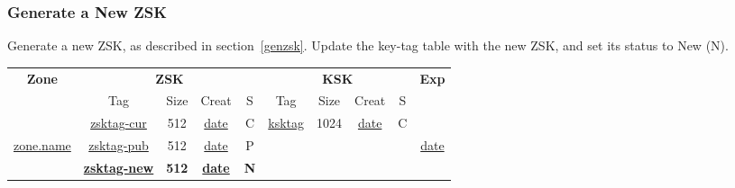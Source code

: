 
\subsubsection{Generate a New ZSK}

Generate a new ZSK, as described in section~\ref{genzsk}.
Update the key-tag table with the new ZSK, and set its status to New (N).

\begin{center}
\begin{tabular}{|c|c|c|c|c|c|c|c|c|c|}
\hline
{\bf Zone} &
\multicolumn{4}{c|}{{\bf ZSK}} &
\multicolumn{4}{c|}{{\bf KSK}} &
{\bf Exp} \\
\cline{2-9}

 & Tag & Size & Creat & S & Tag & Size & Creat & S & \\
\hline

			&
\underline{zsktag-cur}	&
512			&
\underline{date}	&
C			&
\underline{ksktag}	&
1024			&
\underline{date}	&
C			&
			\\

\cline{2-9}

\underline{zone.name}	&
\underline{zsktag-pub}	&
512			&
\underline{date}	&
P			&
& & & & 
\underline{date}	\\

\cline{2-9}

				&
{\bf \underline{zsktag-new}}	&
{\bf 512}			&
{\bf \underline{date}}		&
{\bf N}				&
& & & &	\\

\hline
\end{tabular}
\end{center}

